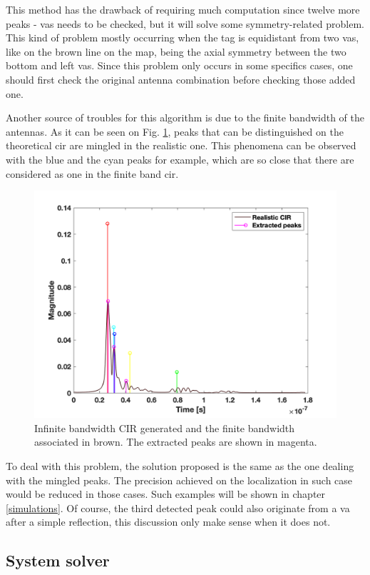 This method has the drawback of requiring much computation since twelve more peaks - \glspl{va} needs to be checked, but it will solve some symmetry-related problem. This kind of problem mostly occurring when the tag is equidistant from two \glspl{va}, like on the brown line on the map, being the axial symmetry between the two bottom and left \glspl{va}. Since this problem only occurs in some specifics cases, one should first check the original antenna combination before checking those added one.
\vspace{2mm}

Another source of troubles for this algorithm is due to the finite bandwidth of the antennas. As it can be seen on Fig. \ref{fig:inftofin}, peaks that can be distinguished on the theoretical \gls{cir} are mingled in the realistic one. This phenomena can be observed with the blue and the cyan peaks for example, which are so close that there are considered as one in the finite band \gls{cir}.

\begin{figure}[H]
\centering
\includegraphics[width=.55\linewidth]{Images/Fig_inf_to_fin.png}
\caption{Infinite bandwidth CIR generated and the finite bandwidth associated in brown. The extracted peaks are shown in magenta. \label{fig:inftofin}}
\end{figure}

To deal with this problem, the solution proposed is the same as the one dealing with the mingled peaks. The precision achieved on the localization in such case would be reduced  in those cases. Such examples will be shown in chapter \ref{simulations}. Of course, the third detected peak could also originate from a \gls{va} after a simple reflection, this discussion only make sense when it does not.
\vspace{2mm}

\subsection{System solver}

